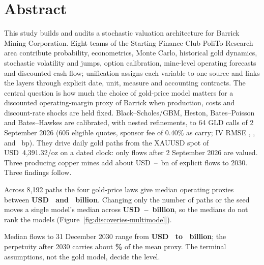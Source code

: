 

\chapter*{Abstract}

\noindent
This study builds and audits a stochastic valuation architecture for Barrick
Mining Corporation. Eight teams of the Starting Finance Club PoliTo Research
area contribute probability, econometrics, Monte Carlo, historical gold
dynamics, stochastic volatility and jumps, option calibration, mine-level
operating forecasts and discounted cash flow; unification assigns each variable
to one source and links the layers through explicit date, unit, measure and
accounting contracts. The central question is how much the choice of
gold-price model matters for a discounted operating-margin proxy of Barrick
when production, costs and discount-rate shocks are held fixed.
Black--Scholes/GBM, Heston, Bates--Poisson and Bates--Hawkes are calibrated,
with nested refinements, to 64 GLD calls of 2 September 2026 (605 eligible
quotes, sponsor fee of 0.40\% as carry; IV RMSE \CalBSIVRMSE, \CalHIVRMSE,
\CalBIVRMSE{} and \CalWIVRMSE~bp). They drive daily gold paths from the XAUUSD
spot of USD~4,391.32/oz on a dated clock: only flows after 2 September 2026
are valued. Three producing copper mines add about
USD~\CuDeltaLow--\CuDeltaHigh~bn of explicit flows to 2030. Three findings
follow.

\begin{tcolorbox}[
  title={Discovery 1: the gold-price model matters less than numerical noise},
  colback=sflightblue, colframe=sfblue, boxrule=0.7pt, arc=1mm,
  left=3mm, right=3mm, top=1mm, bottom=1mm
]
\small
Across 8,192 paths the four gold-price laws give median operating proxies
between \textbf{USD~\ValMedianLow{} and \ValMedianHigh~billion}. Changing only
the number of paths or the seed moves a single model's median across
\textbf{USD~\NumericalMedianLow--\NumericalMedianHigh~billion}, so the medians
do not rank the models (Figure~\ref{fig:discoveries-multimodel}).
\end{tcolorbox}

\begin{tcolorbox}[
  title={Discovery 2: the terminal value carries the result},
  colback=sflightblue, colframe=sfblue, boxrule=0.7pt, arc=1mm,
  left=3mm, right=3mm, top=1mm, bottom=1mm
]
\small
Median flows to 31 December 2030 range from \textbf{USD~\ValExplicitLow{} to
\ValExplicitHigh~billion}; the perpetuity after 2030 carries about
\textbf{\TerminalShare\%} of the mean proxy. The terminal assumptions, not the
gold model, decide the level.
\end{tcolorbox}

